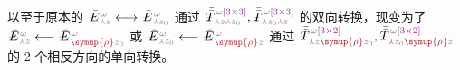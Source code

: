以至于原本的 $\Xint{\mathcolor{gray}{-}}{25}{\bar{E}}^{\;\!\mathcolor{gray}{\omega}}_{\;\! \textcolor{Maroon}{\Yup} \mathcolor{gray}{z}} \longleftrightarrow \Xint{\mathcolor{gray}{-}}{25}{\bar{E}}^{\;\!\mathcolor{gray}{\omega}}_{\;\! \textcolor{Maroon}{\Yup} \mathcolor{gray}{z_0}}$ 通过 $\Xint{\mathcolor{gray}{-}}{30}{\bar{\bar{T}}}^{\;\!\mathcolor{gray}{\omega} \textcolor{Plum}{\left[3 \times 3\right]}}_{\;\! \textcolor{Maroon}{\Yup} \mathcolor{gray}{z} \textcolor{Maroon}{\Yup} \mathcolor{gray}{z_0}}, \Xint{\mathcolor{gray}{-}}{30}{\bar{\bar{T}}}^{\;\!\mathcolor{gray}{\omega} \textcolor{Plum}{\left[3 \times 3\right]}}_{\;\! \textcolor{Maroon}{\Yup} \mathcolor{gray}{z_0} \textcolor{Maroon}{\Yup} \mathcolor{gray}{z}}$ 的双向转换，现变为了 $\Xint{\mathcolor{gray}{-}}{25}{\bar{E}}^{\;\!\mathcolor{gray}{\omega}}_{\;\! \textcolor{Maroon}{\Yup} \mathcolor{gray}{z}} \longleftarrow \Xint{\mathcolor{gray}{-}}{25}{\bar{E}}^{\;\!\mathcolor{gray}{\omega}}_{\;\! \textcolor{Maroon}{\symup{\rho}} \mathcolor{gray}{z_0}}$ 或 $\Xint{\mathcolor{gray}{-}}{25}{\bar{E}}^{\;\!\mathcolor{gray}{\omega}}_{\;\! \textcolor{Maroon}{\Yup} \mathcolor{gray}{z_0}} \longleftarrow \Xint{\mathcolor{gray}{-}}{25}{\bar{E}}^{\;\!\mathcolor{gray}{\omega}}_{\;\! \textcolor{Maroon}{\symup{\rho}} \mathcolor{gray}{z}}$ 通过 $\Xint{\mathcolor{gray}{-}}{30}{\bar{\bar{T}}}^{\;\!\mathcolor{gray}{\omega} \textcolor{Plum}{\left[3 \times 2\right]}}_{\;\! \textcolor{Maroon}{\Yup} \mathcolor{gray}{z} \textcolor{Maroon}{\symup{\rho}} \mathcolor{gray}{z_0}}, \Xint{\mathcolor{gray}{-}}{30}{\bar{\bar{T}}}^{\;\!\mathcolor{gray}{\omega} \textcolor{Plum}{\left[3 \times 2\right]}}_{\;\! \textcolor{Maroon}{\Yup} \mathcolor{gray}{z_0} \textcolor{Maroon}{\symup{\rho}} \mathcolor{gray}{z}}$ 的 2 个相反方向的单向转换。

